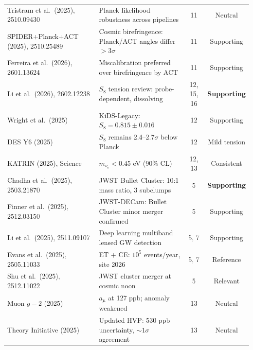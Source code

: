 \documentclass[11pt]{article}
\begin{document}
\begin{longtable}{>{\raggedright}p{3cm}p{5cm}cc}
Tristram et al.\ (2025), 2510.09430 &
Planck likelihood robustness across pipelines &
11 &
Neutral \\

SPIDER+Planck+ACT (2025), 2510.25489 &
Cosmic birefringence: Planck/ACT angles differ $>3\sigma$ &
11 &
Supporting \\

Ferreira et al.\ (2026), 2601.13624 &
Miscalibration preferred over birefringence by ACT &
11 &
Supporting \\

\midrule

Li et al.\ (2026), 2602.12238 &
$S_8$ tension review: probe-dependent, dissolving &
12, 15, 16 &
\textbf{Supporting} \\

Wright et al.\ (2025) &
KiDS-Legacy: $S_8 = 0.815 \pm 0.016$ &
12 &
Supporting \\

DES Y6 (2025) &
$S_8$ remains 2.4--2.7$\sigma$ below Planck &
12 &
Mild tension \\

KATRIN (2025), Science &
$m_{\nu_e} < 0.45$ eV (90\% CL) &
12, 13 &
Consistent \\

\midrule

Chadha et al.\ (2025), 2503.21870 &
JWST Bullet Cluster: 10:1 mass ratio, 3 subclumps &
5 &
\textbf{Supporting} \\

Finner et al.\ (2025), 2512.03150 &
JWST-DECam: Bullet Cluster minor merger confirmed &
5 &
Supporting \\

Li et al.\ (2025), 2511.09107 &
Deep learning multiband lensed GW detection &
5, 7 &
Supporting \\

Evans et al.\ (2025), 2505.11033 &
ET + CE: $10^5$ events/year, site 2026 &
5, 7 &
Reference \\

Shu et al.\ (2025), 2512.11022 &
JWST cluster merger at cosmic noon &
5 &
Relevant \\

\midrule

Muon $g-2$ (2025) &
$a_\mu$ at 127 ppb; anomaly weakened &
13 &
Neutral \\

Theory Initiative (2025) &
Updated HVP: 530 ppb uncertainty, $\sim 1\sigma$ agreement &
13 &
Neutral \\


\end{longtable}
\end{document}
